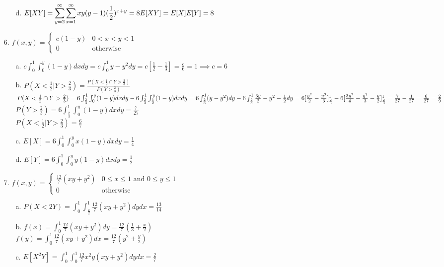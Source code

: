 \documentclass[11pt]{amsart}
\theoremstyle{definition}
\begin{document}
\begin{itemize}
\begin{itemize}
    \item[d.] $\displaystyle
              E[XY]=\sum_{y=2}^\infty\sum_{x=1}^\infty xy(y-1)(\frac 12)^{x+y}=8 \\
              E[XY]=E[X]E[Y]=8$
    
\end{itemize}

\item[6.]$f(x,y)=\begin{cases}
    c(1-y) &0<x<y<1 \\
    0 &\text{otherwise}
\end{cases}$
\begin{itemize}
    \item[a.] $c\int_0^1\int_0^y(1-y)dxdy=c\int_0^1y-y^2dy=c[\frac12-\frac 13]=\frac c6=1\implies c=6$

    \item[b.] $P(X<\frac 12 | Y>\frac 23)=\frac{P(X<\frac 12 \cap Y>\frac 23)}{P(Y>\frac 23)}$ \\
              $P(X<\frac 12 \cap Y>\frac 23)
              =6\int_\frac23^1\int_0^y(1-y)dxdy-6\int_\frac23^1\int_\frac12^y(1-y)dxdy \\
              =6\int_\frac23^1(y-y^2)dy-6\int_\frac23^1\frac{3y}2-y^2-\frac12dy \\
              =6[\frac{y^2}2-\frac{y^3}3]_\frac23^1-6[\frac{3y^2}4-\frac{y^3}3-\frac y2]_\frac23^1 \\
              =\frac7{27}-\frac1{27}=\frac6{27}=\frac29$ \\
              $P(Y>\frac23)=6\int_\frac23^1\int_0^y(1-y)dxdy=\frac7{27}$ \\
              $P(X<\frac 12 | Y>\frac 23)=\frac67$

    \item[c.] $E[X]=6\int_0^1\int_0^yx(1-y)dxdy=\frac 14$

    \item[d.] $E[Y]=6\int_0^1\int_0^yy(1-y)dxdy=\frac 12$
    
\end{itemize}

\item[7.] $f(x,y)=\begin{cases}
    \frac{12}7(xy+y^2) &0\le x\le 1\text{ and }0\le y\le 1\\
    0 &\text{otherwise}
\end{cases}$
\begin{itemize}
    \item[a.] $P(X<2Y)=\int_0^1\int_\frac x2^1\frac{12}7(xy+y^2)dydx=\frac{13}{14}$

    \item[b.] $f(x)=\int_0^1\frac{12}7(xy+y^2)dy=\frac{12}7(\frac13+\frac x2)$ \\
              $f(y)=\int_0^1\frac{12}7(xy+y^2)dx=\frac{12}7(y^2+\frac y2)$

    \item[c.] $E[X^2Y]=\int_0^1\int_0^1\frac{12}7x^2y(xy+y^2)dydx=\frac 27$

\end{itemize}


\end{itemize}
\end{document}
